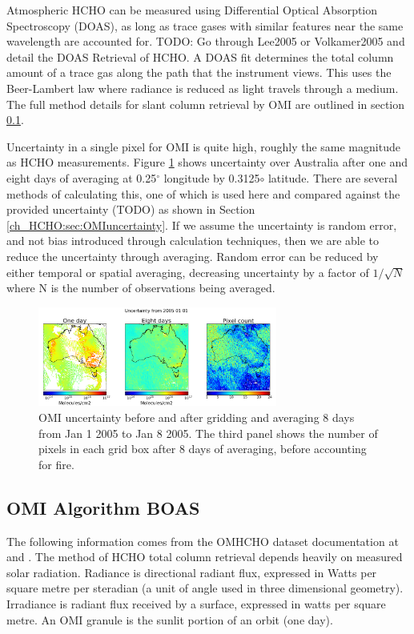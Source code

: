     Atmospheric HCHO can be measured using Differential Optical Absorption Spectroscopy (DOAS), as long as trace gases with similar features near the same wavelength are accounted for.
    TODO: Go through Lee2005 or Volkamer2005 and detail the DOAS Retrieval of HCHO.
    A DOAS fit determines the total column amount of a trace gas along the path that the instrument views.
    This uses the Beer-Lambert law where radiance is reduced as light travels through a medium.
    The full method details for slant column retrieval by OMI are outlined in section \ref{ch_HCHO:sec:OMI_BOAS}.
    
    Uncertainty in a single pixel for OMI is quite high, roughly the same magnitude as HCHO measurements.
    Figure \ref{ch_HCHO:fig:eightDayUncertainty} shows uncertainty over Australia after one and eight days of averaging at 0.25$^{\circ}$ longitude by 0.3125${\circ}$ latitude.
    There are several methods of calculating this, one of which is used here and compared against the provided uncertainty (TODO) as shown in Section \ref{ch_HCHO:sec:OMIuncertainty}.
    If we assume the uncertainty is random error, and not bias introduced through calculation techniques, then we are able to reduce the uncertainty through averaging.
    Random error can be reduced by either temporal or spatial averaging, decreasing uncertainty by a factor of $1/\sqrt{N}$ where N is the number of observations being averaged.
    
    \begin{figure}[!htbp]
      \includegraphics[width=0.7\textwidth]{Figures/HCHO/Uncertainty.png}
      \caption{%
	      OMI uncertainty before and after gridding and averaging 8 days from Jan 1 2005 to Jan 8 2005.
	      The third panel shows the number of pixels in each grid box after 8 days of averaging, before accounting for fire.
      }
      \label{ch_HCHO:fig:eightDayUncertainty}
    \end{figure}
    
  \subsection{OMI Algorithm BOAS}
    \label{ch_HCHO:sec:OMI_BOAS}
    The following information comes from the OMHCHO dataset documentation at \citet{Kurosu2014} and \citet{Chance2002}.
    The method of HCHO total column retrieval depends heavily on measured solar radiation.
    Radiance is directional radiant flux, expressed in Watts per square metre per steradian (a unit of angle used in three dimensional geometry).
    Irradiance is radiant flux received by a surface, expressed in watts per square metre.
    An OMI granule is the sunlit portion of an orbit (one day).
    

